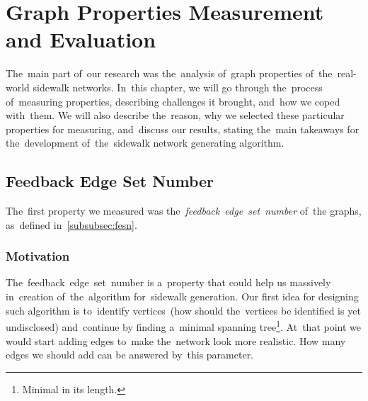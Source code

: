 \chapter{Graph Properties Measurement and Evaluation}
The~main part of~our research was the~analysis of~graph properties of~the~real-world sidewalk networks. In~this chapter, we will go through the~process of~measuring properties, describing challenges it brought, and~how we coped with~them. We will also describe the~reason, why we selected these particular properties for measuring, and~discuss our results, stating the~main takeaways for the~development of~the~sidewalk network generating algorithm.
\section{Feedback Edge Set Number}
The~first property we measured was the~\textit{feedback~edge~set~number} of~the graphs, as~defined in~\autoref{subsubsec:fesn}.
\subsection{Motivation}
The~feedback~edge~set~number is a~property that could help us massively in~creation of~the~algorithm for~sidewalk generation. Our first idea for designing such algorithm is to~identify vertices~(how should the~vertices be identified is yet undisclosed) and~continue by finding a~minimal spanning tree\footnote{Minimal in its length.}. At~that point we would start adding edges to~make the~network look more realistic. How many edges we should add can be answered by~this parameter.
